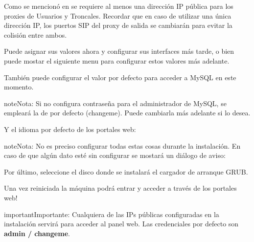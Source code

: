 \documentclass[letterpaper,10pt,spanish]{sphinxmanual}
\begin{document}
\noindent{}

Como se mencionó en {\hyperref[basic_concepts/installation/requirements:requisitos\string-minimos]{}} se requiere al menos una dirección IP pública para los proxies de Usuarios y Troncales. Recordar que en caso de utilizar una única dirección IP, los puertos SIP del proxy de salida se cambiarán para evitar la colisión entre ambos.

Puede asignar sus valores ahora y configurar sus interfaces más tarde, o bien puede mostar el siguiente menu para configurar estos valores más adelante.

\noindent{}

También puede configurar el valor por defecto para acceder a MySQL en este momento.

\begin{notice}{note}{Nota:}
Si no configura contraseña para el administrador de MySQL, se empleará la de por defecto (changeme). Puede cambiarla más adelante si lo desea.
\end{notice}

\noindent{}

Y el idioma por defecto de los portales web:

\noindent{}

\begin{notice}{note}{Nota:}
No es preciso configurar todas estas cosas durante la instalación. En caso de que algún dato esté sin configurar se mostará un diálogo de aviso:
\end{notice}

\noindent{}

Por último, seleccione el disco donde se instalará el cargador de arranque GRUB.

\noindent{}

Una vez reiniciada la máquina podrá entrar y acceder a través de los portales web!

\begin{notice}{important}{Importante:}
Cualquiera de las IPs públicas configuradas en la instalación servirá para acceder al panel web. Las credenciales por defecto son \textbf{admin / changeme}.
\end{notice}
\end{document}
